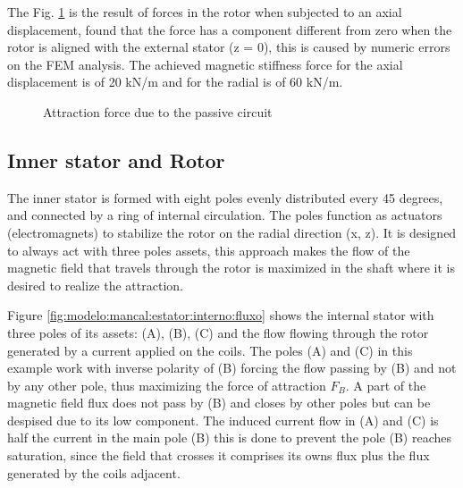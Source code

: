 \documentclass[10pt,fleqn,a4paper,twoside]{article}
\begin{document}
	The Fig. \ref{fig:forca:passivo} is the result of forces in the rotor when subjected to an axial displacement,  found that the force has a component different from zero when the rotor is aligned with the external stator (z = 0), this is caused by numeric errors on the FEM analysis. The achieved magnetic stiffness force for the axial displacement is of 20 kN/m and for the radial is of 60 kN/m. 

	
	\begin{figure}[ht]
		\caption{Attraction force due to the passive circuit}
		\label{fig:forca:passivo}
	\end{figure}	
	
%	
	
	\subsection{Inner stator and Rotor}
	
	The inner stator is formed with eight poles evenly distributed every 45 degrees, and connected by a ring of internal circulation. The poles function as actuators (electromagnets) to stabilize the rotor on the radial direction (x, z).  It is designed to always act with three poles assets, this approach makes the flow of the magnetic field that travels through the rotor is maximized in the shaft where it is desired to realize the attraction.
	
	Figure \ref{fig:modelo:mancal:estator:interno:fluxo} shows the internal stator with three poles of its assets: (A), (B), (C) and the flow flowing through the rotor generated by a current applied on the coils. The poles (A) and (C) in this example work with inverse polarity of (B) forcing the flow passing by (B) and not by any other pole, thus maximizing the force of attraction $F_B$. A part of the magnetic field flux does not pass by (B) and closes by other poles but can be despised due to its low component. The induced current flow in (A) and (C) is half the current in the main pole (B) this is done to prevent the pole (B) reaches saturation, since the field that crosses it comprises its owns flux plus the flux generated by the coils adjacent. 
	
\end{document}
